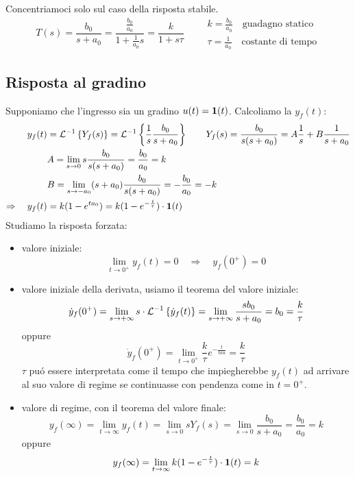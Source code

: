 \documentclass[../main.tex]{subfiles}
\begin{document}
		Concentriamoci solo sul caso della risposta stabile.
		\[
			T(s) = \frac{b_0}{s+a_0} = \frac{\frac{b_0}{a_0}}{1+\frac{1}{a_0}s} = \frac{k}{1+s \tau}
			\qquad 
			\begin{array}{l}
				k = \frac{b_0}{a_0} \quad \text{guadagno statico}
				\\[0.5cm]
				\tau = \frac{1}{a_0} \quad \text{costante di tempo}
			\end{array}
		\]
		
	\subsection{Risposta al gradino}
		Supponiamo che l'ingresso sia un gradino $ u(t) = \textbf{1}(t) $. Calcoliamo la $ y_f(t) $:
		\begin{align*}
			y_f(t) &= \mathcal{L}^{-1} \left\lbrace Y_f(s) \right\rbrace = \mathcal{L}^{-1} \left\lbrace \frac{1}{s} \frac{b_0}{s+a_0} \right\rbrace
			\qquad
			Y_f(s) = \frac{b_0}{s(s+a_0)} = A\frac{1}{s} + B\frac{1}{s+a_0} 
			\\
			&A = \lim_{s \to 0} s \frac{b_0}{s(s+a_0)} = \frac{b_0}{a_0} = k
			\\
			&B = \lim_{s \to -a_0} (s+a_0)\frac{b_0}{s(s+a_0)} = -\frac{b_0}{a_0} = -k
			\\
			\Rightarrow\quad y_f(t) &= k (1-e^{t a_0}) = k(1-e^{-\frac{t}{\tau}}) \cdot \textbf{1}(t)
		\end{align*}
		Studiamo la risposta forzata:
		\begin{itemize}
			\item 
				valore iniziale:
				\[
					\lim_{t \to 0^+} y_f(t) = 0 \quad \Rightarrow \quad y_f(0^+) = 0
				\]
			\item 
				valore iniziale della derivata, usiamo il teorema del valore iniziale:
				\[
					\dot y_f(0^+) = \lim_{s \to +\infty} s \cdot \mathcal{L}^{-1} \left\lbrace \dot y_f(t) \right\rbrace = \lim_{s \to +\infty} \frac{s b_0}{s+a_0} = b_0 = \frac{k}{\tau}
				\]
				oppure
				\[ 
					\dot y_f(0^+) = \lim_{t \to 0^+} \frac{k}{\tau} e^{-\frac{t}{tau}} = \frac{k}{\tau} 
				\]
				$ \tau $ pu\'o essere interpretata come il tempo che impiegherebbe $ y_f(t) $ ad arrivare al suo valore di regime se continuasse con pendenza come in $ t = 0^+ $.
			\item 
				valore di regime, con il teorema del valore finale:
				\[
					y_f(\infty) = \lim_{t \to \infty} y_f(t) = \lim_{s \to 0} s Y_f(s) = \lim_{s \to 0} \frac{b_0}{s+a_0} = \frac{b_0}{a_0} = k
				\]
				oppure
				\[ 
					y_f(\infty) = \lim_{t \to \infty} k(1-e^{-\frac{t}{\tau}}) \cdot \textbf{1}(t) = k 
				\]
		\end{itemize}
		
\end{document}
